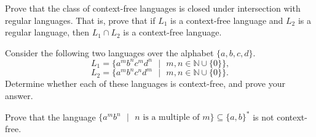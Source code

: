 \documentclass[10pt,addpoints]{exam}
\begin{document}
\newpage
\begin{prob}
Prove that the class of context-free languages is closed under intersection with regular languages. That is, prove that if $L_1$ is a context-free language and $L_2$ is a regular language, then $L_1\cap L_2$ is a context-free language.
\end{prob}


\newpage
\begin{prob}
Consider the following two languages over the alphabet $\{a,b,c,d\}$.
\[L_1=\{a^mb^nc^md^n\text{ }|\text{ }m,n\in\mathbb{N}\cup\{0\}\}\text{,}\]
\[L_2=\{a^mb^nc^nd^m\text{ }|\text{ }m,n\in\mathbb{N}\cup\{0\}\}\text{.}\]
Determine whether each of these languages is context-free, and prove your answer. 
\end{prob}


\newpage
\begin{prob}
Prove that the language $\{a^mb^n\text{ }|\text{ }n\text{ is a multiple of }m\}\subseteq\{a,b\}^*$ is not context-free.
\end{prob}

\end{document}
